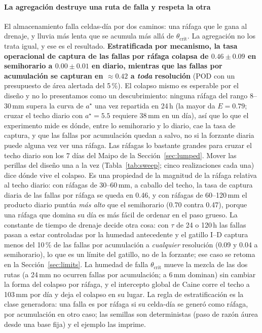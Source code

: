 \documentclass[authoryear,preprint,review,12pt]{elsarticle}
\begin{document}
\paragraph{La agregación destruye una ruta de falla y respeta la otra}
El almacenamiento falla celdas-día por dos caminos: una ráfaga que le gana al
drenaje, y lluvia más lenta que se acumula más allá de $\theta_\mathrm{crit}$. La
agregación no los trata igual, y ese es el resultado. \textbf{Estratificada por
mecanismo, la tasa operacional de captura de las fallas por ráfaga colapsa de
$0.46\pm0.09$ en semihorario a $0.00\pm0.01$ en diario, mientras que las fallas por
acumulación se capturan en ${\approx}0.42$ a \emph{toda} resolución} (POD con un
presupuesto de área alertada del 5\,\%). El colapso mismo es esperable por el diseño y no lo presentamos como un descubrimiento: ninguna ráfaga del rango 8--30\,mm supera la curva de $a^\star$ una vez repartida en 24\,h (la mayor da $E=0.79$; cruzar el techo diario con $a^\star=5.5$ requiere 38\,mm en un día), así que lo que el experimento mide es dónde, entre lo semihorario y lo diario, cae la tasa de captura, y que las fallas por acumulación quedan a salvo, no si la forzante diaria puede alguna vez ver una ráfaga. Las ráfagas lo bastante grandes para cruzar el techo diario son los 7 días del Maipo de la Sección~\ref{sec:lumped}. Mover las perillas del diseño una a la vez (Tabla~\ref{tab:sweep}; cinco realizaciones cada una) dice dónde vive el colapso. Es una propiedad de la magnitud de la ráfaga relativa al techo diario: con ráfagas de 30--60\,mm, a caballo del techo, la tasa de captura diaria de las fallas por ráfaga se queda en 0.46, y con ráfagas de 60--120\,mm el producto diario puntúa \emph{más alto} que el semihorario (0.70 contra 0.47), porque una ráfaga que domina su día es más fácil de ordenar en el paso grueso. La constante de tiempo de drenaje decide otra cosa: con $\tau$ de 24 o 120\,h las fallas pasan a estar controladas por la humedad antecedente y el gatillo I--D captura menos del 10\,\% de las fallas por acumulación a \emph{cualquier} resolución (0.09 y 0.04 a semihorario), lo que es un límite del gatillo, no de la forzante; ese caso se retoma en la Sección~\ref{sec:limits}. La humedad de falla $\theta_\mathrm{crit}$ mueve la mezcla de las dos rutas (a 24\,mm no ocurren fallas por acumulación; a 6\,mm dominan) sin cambiar la forma del colapso por ráfaga, y el intercepto global de Caine corre el techo a 103\,mm por día y deja el colapso en su lugar. La regla de estratificación es la clase generadora: una falla es por ráfaga si su celda-día se generó como ráfaga, por acumulación en otro caso; las semillas son deterministas (paso de razón áurea desde una base fija) y el ejemplo las imprime.
\end{document}
